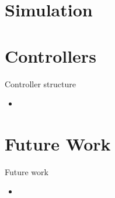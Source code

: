 \documentclass[11pt]{beamer}
\begin{document}
\section{Simulation}
\begin{frame}{}

\end{frame}
\section{Controllers}
\begin{frame}{Controller structure}
\begin{itemize}
\item 
\end{itemize}
\end{frame}
\section{Future Work}
\begin{frame}{Future work}
\begin{itemize}
\item 
\end{itemize}

\end{frame}
\end{document}
